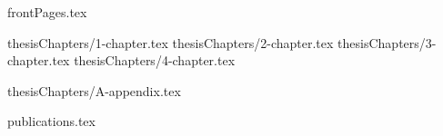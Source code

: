 \documentclass[a4paper,12pt,oneside,openany]{book}
\begin{document}
 {frontPages.tex}



 {thesisChapters/1-chapter.tex}
 {thesisChapters/2-chapter.tex}
 {thesisChapters/3-chapter.tex}
 {thesisChapters/4-chapter.tex}

\newpage
{}
\singlespacing
\printbibliography[title={\bibName}]

\newpage\appendix

 {thesisChapters/A-appendix.tex}

\ifnum{}
\newpage
{}
 {publications.tex}
\fi
\end{document}
